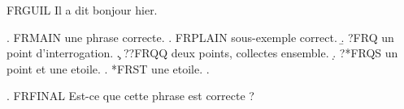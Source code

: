 
\usepackage[french]{babel}

FRGUIL Il a dit \og bonjour \fg{} hier.

\ex. FRMAIN une phrase correcte.
\a. FRPLAIN sous-exemple correct.
\b. ?FRQ un point d'interrogation.
\c. ??FRQQ deux points, collectes ensemble.
\d. ?*FRQS un point et une etoile.
\e. *FRST une etoile.
\z.

\ex. FRFINAL Est-ce que cette phrase est correcte ?

